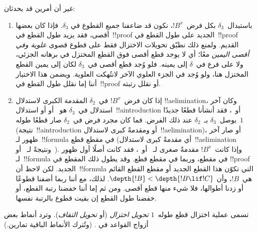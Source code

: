 \documentclass[../../../include/open-logic-section]{subfiles}
\begin{document}
غير أن أمرين قد يحدثان:
\begin{enumerate}
  \item باستبدال~$\delta_3$ بكل فرض~$!B^x$، نكون قد ضاعفنا جميع القطوع في
  $\delta_3$. فإذا كان بعضها أقصى، فقد يزيد طول القطع في~!!{proof} الجديد
  على طول القطع في~!!{proof} القديم. ولمنع ذلك نطبّق تحويلات الاختزال فقط
  على قطوع قصوى \emph{علوية وفي أقصى اليمين} معًا؛ أي لا يوجد قطع أقصى فوق
  القطع المختزل في برهانه الجزئي، ولا على فرع في~$\delta$ إلى يمينه. فلو
  وُجد قطع أقصى في~$\delta_3$ لكان إلى يمين القطع المختزل هنا، ولو وُجد في
  الجزء العلوي الآخر لانتُهكت العلوية. ويضمن هذا الاختيار أننا إما نقلل طول
  القطع في~!!{proof} أو نقلل رتبته.
  \item إذا كان فرض~$!B^x$ في~$\delta_2$ المقدمة الكبرى لاستدلال
  !!a{elimination}، وكان آخر استدلال في~$\delta_3$ هو~\Elim{\lor} أو
  \Elim{\lexists} أو استدلال~!!a{introduction} أو~\FalseInt، فقد أنشأنا
  قطعًا جديدًا بوصل~$\delta_3$ بـ~$\delta_2$ عند ذلك الفرض. فما كان مجرد
  فرض في~$\delta_2$ صار قطعًا طوله~$1$ (نتيجة~!!a{introduction} أو
  \FalseInt ومقدمةً كبرى لاستدلال~!!a{elimination})، أو صار آخر ظهور
  لـ~!!{formula} في مقطع قطع (أي مقدمةً كبرى لاستدلال~!!a{elimination}
  ونتيجةً لـ~\Elim{\lor} أو~\Elim{\lexists}). وإذا كانت~$!B^x$ مقدمةً
  صغرى لـ~\Elim{\lor} أو~\Elim{\lexists}، فقد كانت أصلًا أول ظهور
  لـ~!!{formula} في مقطع، وربما في مقطع قطع. وقد يطول ذلك المقطع في
  !!{proof} الجديد. لكن لاحظ أن~!!{formula} التي تكوّن هذا القطع الجديد أو
  مقطع القطع القائم هي~$!B$، وأن
  $\depth{!B} < \depth{!B \lif !C}$. لذلك، مع أننا ربما أضفنا قطوعًا أو
  زدنا أطوالها، فلا شيء منها قطع أقصى. ومن ثم إما أننا خفضنا رتبة القطع، أو
  خفضنا طول القطع إن بقيت قطوع بالرتبة نفسها.
\end{enumerate}

تسمى عملية اختزال قطع طوله~$1$ \emph{تحويل اختزال} (أو \emph{تحويل
التفاف}). وترد أنماط بعض أزواج القواعد في
. (وتُترك الأنماط الباقية تمارين.)
\end{document}
